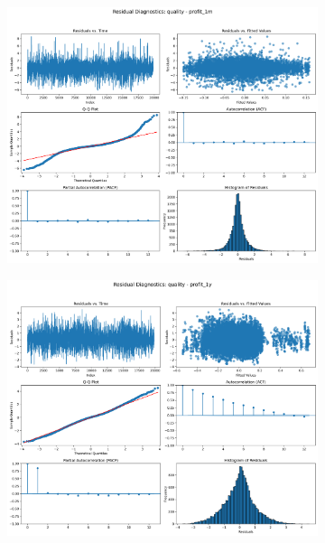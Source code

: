 \documentclass[11pt,english,a4paper,hidelinks]{book}
\begin{document}
\begin{figure}[H]
    \centering
    \begin{subfigure}[b]{0.32\textwidth}
        \centering
        \includegraphics[width=\textwidth]{images/code/models/linear_regression/first_model/LAT/quality_profit_1m_residuals - Gaussian.png}
    \end{subfigure}
    \hfill
    \begin{subfigure}[b]{0.32\textwidth}
        \centering
        \includegraphics[width=\textwidth]{images/code/models/linear_regression/first_model/LAT/quality_profit_1y_residuals - Gaussian.png}

\end{subfigure}
\end{figure}
\end{document}
